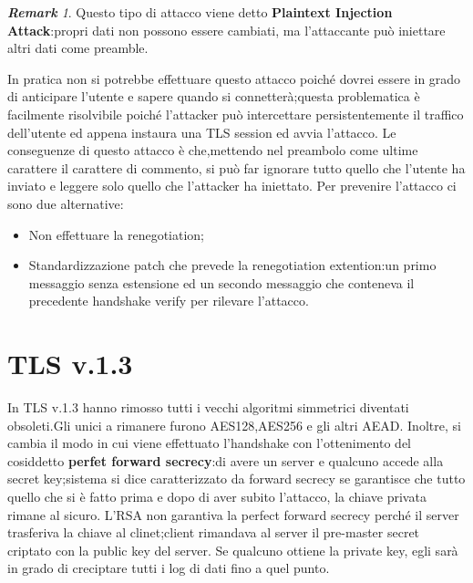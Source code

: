 \documentclass{book}
\theoremstyle{remark}
\newtheorem*{remark}{\textbf{Remark}}
\begin{document}
\begin{remark}
	Questo tipo di attacco viene detto \textbf{Plaintext Injection Attack}:\@i propri dati non possono essere cambiati, ma l'attaccante può iniettare altri dati come preamble\@.
\end{remark}
In pratica non si potrebbe effettuare questo attacco poiché dovrei essere in grado di anticipare  l'utente e sapere quando si connetterà;\@tuttavia questa problematica è facilmente risolvibile poiché l'attacker può intercettare persistentemente il traffico dell'utente ed appena instaura una TLS session ed avvia l'attacco\@. Le conseguenze di questo attacco è che,mettendo nel preambolo come ultime carattere il carattere di commento, si può far ignorare tutto quello che l'utente ha inviato e leggere solo quello che l'attacker ha iniettato\@. \newline
Per prevenire l'attacco ci sono due alternative:\begin{itemize}
	\item Non effettuare la renegotiation;\@
	\item Standardizzazione patch che prevede la renegotiation extention:\@prevede un primo messaggio senza estensione ed un secondo messaggio che conteneva il precedente handshake verify per rilevare l'attacco\@.
\end{itemize}
\section{TLS v\@.1\@.3}
In TLS v\@.1\@.3 hanno rimosso tutti i vecchi algoritmi simmetrici diventati obsoleti\@.Gli unici a rimanere furono AES128,AES256 e gli altri AEAD\@. Inoltre, si cambia il modo in cui viene effettuato l'handshake con l'ottenimento del cosiddetto \textbf{perfet forward secrecy}:\@supponiamo di avere un server e qualcuno accede alla secret key;\@il sistema si dice caratterizzato da forward secrecy se garantisce che tutto quello che si è fatto prima e dopo di aver subito l'attacco, la chiave privata rimane al sicuro\@.\newline
L'RSA non garantiva la perfect forward secrecy perché il server trasferiva la chiave al clinet;\@il client rimandava al server il pre-master secret criptato con la public key del server\@. Se qualcuno ottiene la private key, egli sarà in grado di creciptare tutti i log di dati fino a quel punto\@.
\end{document}
